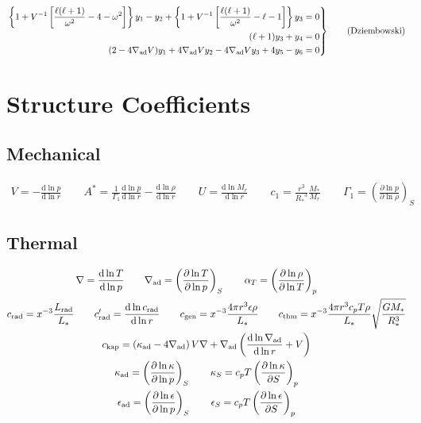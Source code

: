 \documentclass{article}
\newcommand{\diff}{\ensuremath{\mathrm{d}}}
\newcommand{\As}{\ensuremath{A^{\ast}}}
\newcommand{\aT}{\ensuremath{\alpha_{T}}}
\newcommand{\nabad}{\ensuremath{\nabla_{\rm ad}}}
\newcommand{\kapad}{\ensuremath{\kappa_{\rm ad}}}
\newcommand{\kapS}{\ensuremath{\kappa_{S}}}
\newcommand{\epsad}{\ensuremath{\epsilon_{\rm ad}}}
\newcommand{\epsS}{\ensuremath{\epsilon_{S}}}
\newcommand{\crad}{\ensuremath{c_{\rm rad}}}
\newcommand{\cgen}{\ensuremath{c_{\rm gen}}}
\newcommand{\cthm}{\ensuremath{c_{\rm thm}}}
\newcommand{\ckap}{\ensuremath{c_{\rm kap}}}
\newcommand{\Rstar}{\ensuremath{R_{\ast}}}
\newcommand{\Mstar}{\ensuremath{M_{\ast}}}
\newcommand{\Lrad}{\ensuremath{L_{\rm rad}}}
\newcommand{\Lstar}{\ensuremath{L_{\ast}}}
\begin{document}
\begin{equation*}
\left.
\begin{aligned}
\left\{ 1 + V^{-1} \left[ \frac{\ell(\ell+1)}{\omega^{2}} - 4 - \omega^{2} \right] \right\} y_{1} -
y_{2} +
\left\{ 1 + V^{-1} \left[ \frac{\ell(\ell+1)}{\omega^{2}} - \ell - 1 \right] \right\} y_{3} &= 0 \\
(\ell + 1) y_{3} + y_{4} &= 0 \\
(2 - 4\nabad V) y_{1} + 4 \nabad V y_{2} - 4 \nabad V y_{3} + 4 y_{5} - y_{6} &= 0
\end{aligned}
\right\} \qquad \text{(Dziembowski)}
\end{equation*}


\section*{Structure Coefficients}

\subsection*{Mechanical}

\begin{gather*}
V = -\frac{\diff \ln p}{\diff \ln r} \qquad
\As = \frac{1}{\Gamma_{1}} \frac{\diff \ln p}{\diff \ln r} - \frac{\diff \ln \rho}{\diff \ln r} \qquad
U = \frac{\diff \ln M_{r}}{\diff \ln r} \qquad
c_1 = \frac{r^{3}}{\Rstar^{3}} \frac{\Mstar}{M_{r}} \qquad
\Gamma_{1} = \left( \frac{\partial \ln p}{\partial \ln \rho} \right)_{S}
\end{gather*}

\subsection*{Thermal}

\begin{gather*}
\nabla = \frac{\diff \ln T}{\diff \ln p} \qquad
\nabad = \left( \frac{\partial \ln T}{\partial \ln p} \right)_{S} \qquad
\aT = \left( \frac{\partial \ln \rho}{\partial \ln T} \right)_{p} \qquad \\
\crad = x^{-3} \frac{\Lrad}{\Lstar} \qquad
\crad' = \frac{\diff \ln \crad}{\diff \ln r} \qquad
\cgen = x^{-3} \frac{4\pi r^{3} \epsilon \rho}{\Lstar} \qquad
\cthm = x^{-3} \frac{4\pi r^{3} c_{p} T \rho}{\Lstar} \sqrt{\frac{G\Mstar}{\Rstar^{3}}} \\
\ckap = \left( \kapad - 4 \nabad \right) V \nabla + \nabad \left( \frac{\diff \ln \nabad}{\diff \ln r} + V \right) \\
\kapad = \left( \frac{\partial \ln \kappa}{\partial \ln p} \right)_{S} \qquad
\kapS = c_{p} T \left( \frac{\partial \ln \kappa}{\partial S} \right)_{p} \\
\epsad = \left( \frac{\partial \ln \epsilon}{\partial \ln p} \right)_{S} \qquad
\epsS = c_{p} T \left( \frac{\partial \ln \epsilon}{\partial S} \right)_{p}
\end{gather*}
\end{document}
